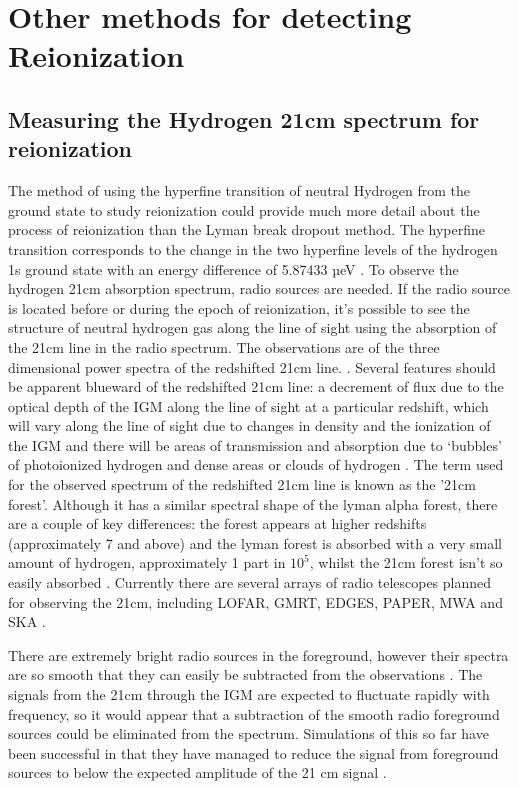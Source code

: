 
\section{Other methods for detecting Reionization} %
\label{sec:other_methods21cm}
        
        \subsection{Measuring the Hydrogen 21cm spectrum for reionization} %
	\label{sub:Measuring_21cm} 
The method of using the hyperfine transition of neutral Hydrogen from the ground state to study reionization could provide much more detail about the process of reionization than the Lyman break dropout method. The hyperfine transition corresponds to the change in the two hyperfine levels of the hydrogen 1s ground state with an energy difference of 5.87433 µeV \cite{hyperphysics21}. To observe the hydrogen 21cm absorption spectrum, radio sources are needed. If the radio source is located before or during the epoch of reionization, it’s possible to see the structure of neutral hydrogen gas along the line of sight using the absorption of the 21cm line in the radio spectrum\cite[2]{mack2012detecting}. The observations are of the three dimensional power spectra of the redshifted  21cm line. \cite[1]{liu2011method}.  Several features should be apparent blueward of the redshifted 21cm line: a decrement of flux due to the optical depth of the IGM along the line of sight at a particular redshift, which will vary along the line of sight due to changes in density and the ionization of the IGM and there will be areas of transmission and absorption due to ‘bubbles’ of photoionized hydrogen and dense areas or clouds of hydrogen \cite[2]{mack2012detecting}. The term used for the observed spectrum of the redshifted 21cm line is known as the '21cm forest'. Although it has a similar spectral shape of the lyman alpha forest, there are a couple of key differences: the forest appears at higher redshifts (approximately 7 and above) and the lyman forest is absorbed with a very small amount of hydrogen, approximately 1 part in $10^5$, whilst the 21cm forest isn't so easily absorbed \cite[2]{mack2012detecting}. Currently there are several arrays of radio telescopes planned for observing the 21cm, including  LOFAR, GMRT, EDGES, PAPER, MWA and SKA \cite[2]{mack2012detecting}.

There are extremely bright radio sources in the foreground, however their spectra are so smooth that they can easily be subtracted from the observations \cite{petrovic2011systematic}. The signals from the 21cm through the IGM are expected to fluctuate rapidly with frequency, so it would appear that a subtraction of the smooth radio foreground sources could be eliminated from the spectrum. Simulations of this so far have been successful in that they have managed to reduce the signal from foreground sources to below the expected amplitude of the 21 cm signal \cite[19]{liu2011method}.

